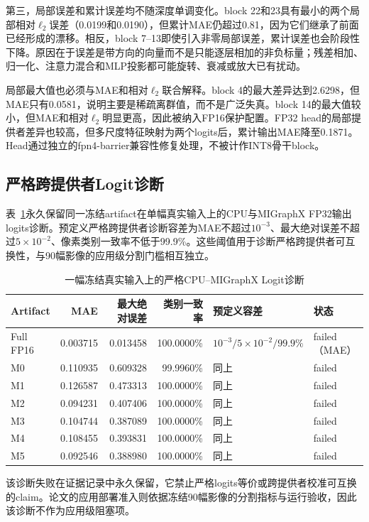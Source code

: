 \documentclass[conference]{IEEEtran}
\begin{document}
第三，局部误差和累计误差均不随深度单调变化。block 22和23具有最小的两个局部相对$\ell_2$误差（0.0199和0.0190），但累计MAE仍超过0.81，因为它们继承了前面已经形成的漂移。相反，block 7--13即使引入非零局部误差，累计误差也会阶段性下降。原因在于误差是带方向的向量而不是只能逐层相加的非负标量；残差相加、归一化、注意力混合和MLP投影都可能旋转、衰减或放大已有扰动。

局部最大值也必须与MAE和相对$\ell_2$联合解释。block 4的最大差异达到2.6298，但MAE只有0.0581，说明主要是稀疏离群值，而不是广泛失真。block 14的最大值较小，但MAE和相对$\ell_2$明显更高，因此被纳入FP16保护配置。FP32 head的局部提供者差异也较高，但多尺度特征映射为两个logits后，累计输出MAE降至0.1871。Head通过独立的fpn4-barrier兼容性修复处理，不被计作INT8骨干block。

\subsection{严格跨提供者Logit诊断}

表~\ref{tab:strict-logits_cn}永久保留同一冻结artifact在单幅真实输入上的CPU与MIGraphX FP32输出logits诊断。预定义严格跨提供者诊断容差为MAE不超过$10^{-3}$、最大绝对误差不超过$5\times10^{-2}$、像素类别一致率不低于99.9\%。这些阈值用于诊断严格跨提供者可互换性，与90幅影像的应用级分割门槛相互独立。

\begin{table}[t]
\caption{一幅冻结真实输入上的严格CPU--MIGraphX Logit诊断}
\label{tab:strict-logits_cn}
\centering
\small
\begin{tabular}{lrrrll}
\toprule
Artifact & MAE & 最大绝对误差 & 类别一致率 & 预定义容差 & 状态 \\
\midrule
Full FP16 & 0.003715 & 0.013458 & 100.0000\% & $10^{-3}/5\!\times\!10^{-2}/99.9\%$ & failed（MAE） \\
M0 & 0.110935 & 0.609328 & 99.9960\% & 同上 & failed \\
M1 & 0.126587 & 0.473313 & 100.0000\% & 同上 & failed \\
M2 & 0.094231 & 0.407406 & 100.0000\% & 同上 & failed \\
M3 & 0.104744 & 0.387089 & 100.0000\% & 同上 & failed \\
M4 & 0.108455 & 0.393831 & 100.0000\% & 同上 & failed \\
M5 & 0.092546 & 0.388980 & 100.0000\% & 同上 & failed \\
\bottomrule
\end{tabular}
\end{table}

该诊断失败在证据记录中永久保留，它禁止严格logits等价或跨提供者校准可互换的claim。论文的应用部署准入则依据冻结90幅影像的分割指标与运行验收，因此该诊断不作为应用级阻塞项。
\end{document}
